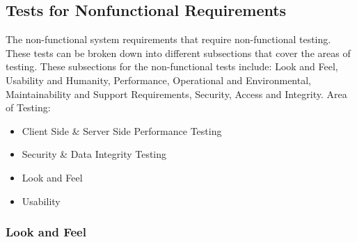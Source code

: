 \documentclass[12pt, titlepage]{article}
\begin{document}
\subsection{Tests for Nonfunctional Requirements}



The non-functional system requirements that require non-functional testing. These tests can be broken down into different subsections that cover the areas of testing. These subsections for the non-functional tests include: Look and Feel, Usability and Humanity, Performance, Operational and Environmental, Maintainability and Support Requirements, Security, Access and Integrity.
Area of Testing:
\begin{itemize}
    \item Client Side \& Server Side Performance Testing
    \item Security \& Data Integrity Testing
    \item Look and Feel 
    \item Usability
\end{itemize}


\subsubsection{Look and Feel}
\end{document}
